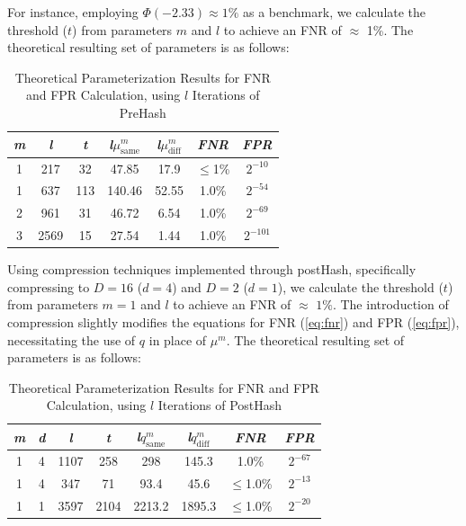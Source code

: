 For instance, employing \(\Phi(-2.33) \approx 1\%\) as a benchmark, we calculate the threshold (\(t\)) from parameters \(m\) and \(l\) to achieve an FNR of \(\approx\) 1\%. The theoretical resulting set of parameters is as follows: 

\begin{table}[htbp] 
    \centering
    \begin{tabular}{|c|c|c|c|c|c|c|}
        \hline
        \textit{m} & \textit{l} & \textit{t} & \textit{l}\(\mu_{\text{same}}^m\) & \textit{l}\(\mu_{\text{diff}}^m\) & \textit{FNR} & \textit{FPR} \\
        \hline
        1 & 217 & 32 & 47.85 & 17.9 & \(\leq\)1\% & \(2^{-10}\)\\
        1 & 637 & 113 & 140.46 & 52.55 & 1.0\% & \(2^{-54}\) \\
        2 & 961 & 31 & 46.72 & 6.54 & 1.0\% & \(2^{-69}\) \\
        3 & 2569 & 15 & 27.54 & 1.44 & 1.0\% &\(2^{-101}\) \\
        \hline
    \end{tabular}
    \caption{Theoretical Parameterization Results for FNR and FPR Calculation, using $l$ Iterations of PreHash}
    \label{tab:theoretical_parameterization_PreHash}
\end{table}

Using compression techniques implemented through postHash, specifically compressing to \( D = 16 \) (\( d = 4 \)) and \( D = 2 \) (\( d = 1 \)), we calculate the threshold (\( t \)) from parameters \( m = 1 \) and \( l \) to achieve an FNR of \(\approx\) \(1\%\). The introduction of compression slightly modifies the equations for FNR (\ref{eq:fnr}) and FPR (\ref{eq:fpr}), necessitating the use of \( q \) in place of \(\mu^m\). The theoretical resulting set of parameters is as follows:

\begin{table}[htbp] 
    \centering
    \begin{tabular}{|c|c|c|c|c|c|c|c|}
        \hline
        \textit{m} & \textit{d} & \textit{l} & \textit{t} & \textit{l}\(q_{\text{same}}^m\) & \textit{l}\(q_{\text{diff}}^m\) & \textit{FNR} & \textit{FPR} \\
        \hline
        1 & 4 & 1107 & 258 & 298 & 145.3 & 1.0\% & \(2^{-67}\) \\
        1 & 4 & 347 & 71 & 93.4 & 45.6 & \(\leq\)1.0\% & \(2^{-13}\)\\
        1 & 1 & 3597 & 2104 & 2213.2 & 1895.3 & \(\leq\)1.0\% & \(2^{-20}\)\\
        \hline
    \end{tabular}
    \caption{Theoretical Parameterization Results for FNR and FPR Calculation, using $l$ Iterations of PostHash}
    \label{tab:theoretical_parameterization_PostHash}
\end{table}


